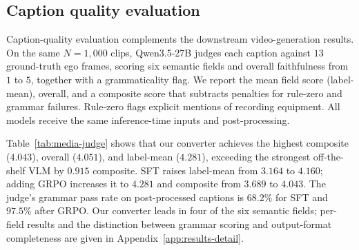 \documentclass{article} %
\begin{document}
\subsection{Caption quality evaluation}
\label{sec:captioner-eval}
\label{sec:media-judge}

Caption-quality evaluation complements the downstream video-generation
results. On the same $N{=}1{,}000$ clips, Qwen3.5-27B judges each caption
against $13$ ground-truth ego frames, scoring six semantic fields and overall
faithfulness from $1$ to $5$, together with a grammaticality flag.
We report the mean field score (label-mean), overall, and a composite score
that subtracts penalties for rule-zero and grammar failures.
Rule-zero flags explicit mentions of recording equipment.
All models receive the same inference-time inputs and post-processing.

Table~\ref{tab:media-judge} shows that our converter achieves the highest
composite ($4.043$), overall ($4.051$), and label-mean ($4.281$), exceeding the
strongest off-the-shelf VLM by $0.915$ composite. SFT raises label-mean from
$3.164$ to $4.160$; adding GRPO increases it to $4.281$ and composite from
$3.689$ to $4.043$. The judge's grammar pass rate on post-processed captions
is $68.2\%$ for SFT and $97.5\%$ after GRPO. Our converter leads in four of
the six semantic fields; per-field results and the distinction between
grammar scoring and output-format completeness are given in
Appendix~\ref{app:results-detail}.

\begin{table}[h]
\centering
\footnotesize
\captionsetup{font=footnotesize}
\caption{Caption quality on $N{=}1{,}000$ clips, evaluated by Qwen3.5-27B.
Label-mean averages six field scores; $\mathrm{Comp.}=\mathrm{Overall}
-\mathbb{1}[\mathrm{Rule\mbox{-}0}]-0.3\mathbb{1}[\neg\mathrm{Gram.}]$.
Gram. is the judge's pass rate on post-processed captions.
Higher is better except Rule-0. Best per column in \textbf{bold}.}
\label{tab:media-judge}
\end{table}
\end{document}
